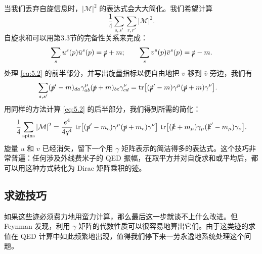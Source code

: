 当我们丢弃自旋信息时，$|\mathcal{M}|^2$ 的表达式会大大简化。我们希望计算
\begin{equation}
  \frac{1}{4}\sum_{s,s'}\sum_{r,r'}|\mathcal{M}|^2 .
\end{equation}
自旋求和可以用第3.3节的完备性关系来完成：
\begin{equation}
  \sum_s u^s(p)\bar{u}^s(p) = \slashed{p} + m;\qquad
  \sum_s v^s(p)\bar{v}^s(p) = \slashed{p} - m .
  \label{eq:5.3}
\end{equation}
处理 \eqref{eq:5.2} 的前半部分，并写出旋量指标以便自由地把 $v$ 移到 $\bar{v}$ 旁边，我们有
\begin{equation}
  \begin{aligned}
    \sum_{s,s'} (\slashed{p}' - m)_{da}\gamma^\mu_{ab}(\slashed{p} + m)_{bc}
      \gamma^\nu_{cd} &= \mathrm{tr}\bigl[
        (\slashed{p}' - m)\gamma^\mu(\slashed{p} + m)\gamma^\nu \bigr].
  \end{aligned}
\end{equation}
用同样的方法计算 \eqref{eq:5.2} 的后半部分，我们得到所需的简化：
\begin{equation}
  \frac{1}{4}\sum_{\text{spins}}|\mathcal{M}|^2
    = \frac{e^4}{4q^4}\ \mathrm{tr}\bigl[
      (\slashed{p}' - m_e)\gamma^\mu(\slashed{p} + m_e)\gamma^\nu \bigr]\
      \mathrm{tr}\bigl[ (\slashed{k} + m_\mu)\gamma_\mu(\slashed{k}' - m_\mu)
        \gamma_\nu \bigr] .
  \label{eq:5.4}
\end{equation}
旋量 $u$ 和 $v$ 已经消失，留下一个用 $\gamma$ 矩阵表示的简洁得多的表达式。这个技巧非常普遍：任何涉及外线费米子的 QED 振幅，在取平方并对自旋求和或平均后，都可以用这种方式转化为 Dirac 矩阵乘积的迹。

\subsection{求迹技巧}

如果这些迹必须费力地用蛮力计算，那么最后这一步就谈不上什么改进。但 Feynman 发现，利用 $\gamma$ 矩阵的代数性质可以很容易地算出它们。由于这类迹的求值在 QED 计算中如此频繁地出现，值得我们停下来一劳永逸地系统处理这个问题。

